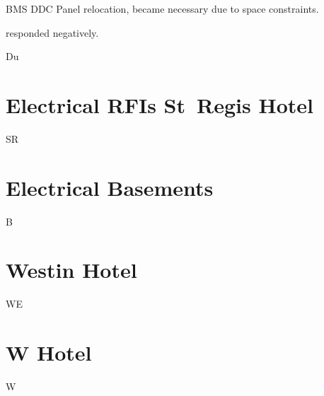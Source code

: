  {
 	\item BMS DDC Panel relocation, became necessary due to space constraints.
 	\item \KA responded negatively.
 }

 { } {Du}
 {
 	\item \lorem
 }


\chapter{Electrical RFIs St~Regis Hotel}
 {SR}
%
\chapter {Electrical Basements}
 {B}
%
\chapter {Westin Hotel}
 {WE}
%
\chapter {W Hotel}
 {W}










